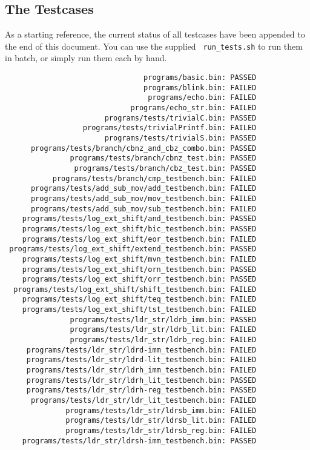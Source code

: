 \documentclass{article}
\begin{document}
\subsection{The Testcases}
As a starting reference, the current status of all testcases have been
appended to the end of this document. You can use the supplied {\tt
run\_tests.sh} to run them in batch, or simply run them each by hand.
\clearpage
\begin{verbatim}
                                programs/basic.bin: PASSED
                                programs/blink.bin: FAILED
                                 programs/echo.bin: FAILED
                             programs/echo_str.bin: FAILED
                       programs/tests/trivialC.bin: PASSED
                  programs/tests/trivialPrintf.bin: FAILED
                       programs/tests/trivialS.bin: PASSED
      programs/tests/branch/cbnz_and_cbz_combo.bin: PASSED
               programs/tests/branch/cbnz_test.bin: PASSED
                programs/tests/branch/cbz_test.bin: PASSED
           programs/tests/branch/cmp_testbench.bin: FAILED
      programs/tests/add_sub_mov/add_testbench.bin: FAILED
      programs/tests/add_sub_mov/mov_testbench.bin: FAILED
      programs/tests/add_sub_mov/sub_testbench.bin: FAILED
    programs/tests/log_ext_shift/and_testbench.bin: PASSED
    programs/tests/log_ext_shift/bic_testbench.bin: PASSED
    programs/tests/log_ext_shift/eor_testbench.bin: FAILED
 programs/tests/log_ext_shift/extend_testbench.bin: PASSED
    programs/tests/log_ext_shift/mvn_testbench.bin: FAILED
    programs/tests/log_ext_shift/orn_testbench.bin: PASSED
    programs/tests/log_ext_shift/orr_testbench.bin: PASSED
  programs/tests/log_ext_shift/shift_testbench.bin: FAILED
    programs/tests/log_ext_shift/teq_testbench.bin: FAILED
    programs/tests/log_ext_shift/tst_testbench.bin: FAILED
               programs/tests/ldr_str/ldrb_imm.bin: PASSED
               programs/tests/ldr_str/ldrb_lit.bin: FAILED
               programs/tests/ldr_str/ldrb_reg.bin: FAILED
     programs/tests/ldr_str/ldrd-imm_testbench.bin: FAILED
     programs/tests/ldr_str/ldrd-lit_testbench.bin: FAILED
     programs/tests/ldr_str/ldrh_imm_testbench.bin: FAILED
     programs/tests/ldr_str/ldrh_lit_testbench.bin: PASSED
     programs/tests/ldr_str/ldrh-reg_testbench.bin: PASSED
      programs/tests/ldr_str/ldr_lit_testbench.bin: FAILED
              programs/tests/ldr_str/ldrsb_imm.bin: FAILED
              programs/tests/ldr_str/ldrsb_lit.bin: FAILED
              programs/tests/ldr_str/ldrsb_reg.bin: FAILED
    programs/tests/ldr_str/ldrsh-imm_testbench.bin: PASSED

\end{verbatim}
\end{document}
